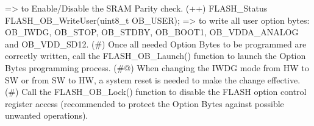 \begin{DoxyVerb}
                  => to Enable/Disable the SRAM Parity check.            
                 (++) FLASH_Status FLASH_OB_WriteUser(uint8_t OB_USER); 
                  => to write all user option bytes: OB_IWDG, OB_STOP, OB_STDBY, 
                     OB_BOOT1, OB_VDDA_ANALOG and OB_VDD_SD12.  
         (#) Once all needed Option Bytes to be programmed are correctly written, 
             call the FLASH_OB_Launch() function to launch the Option Bytes 
             programming process.
         (#@) When changing the IWDG mode from HW to SW or from SW to HW, a system 
              reset is needed to make the change effective.  
         (#) Call the FLASH_OB_Lock() function to disable the FLASH option control 
             register access (recommended to protect the Option Bytes against 
             possible unwanted operations).\end{DoxyVerb}


